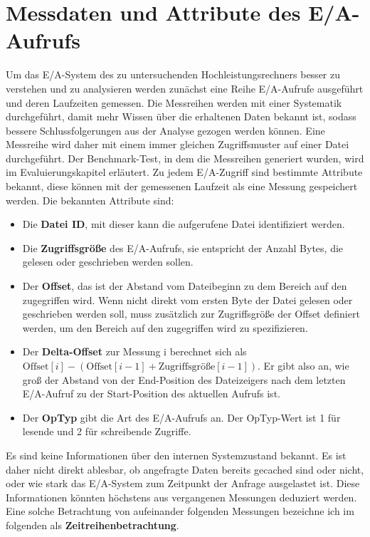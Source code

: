 \documentclass[
	12pt,
	a4paper,
	BCOR10mm,
	DIV14,
	listof=totoc,
	bibliography=totoc,
	headsepline
]{scrreprt}
\begin{document}
\section{Messdaten und Attribute des E/A-Aufrufs}
\label{analyse:mess+att}
Um das E/A-System des zu untersuchenden Hochleistungsrechners besser zu verstehen und zu analysieren werden zunächst eine Reihe E/A-Aufrufe ausgeführt und deren Laufzeiten gemessen. Die Messreihen werden mit einer Systematik durchgeführt, damit mehr Wissen über die erhaltenen Daten bekannt ist, sodass bessere Schlussfolgerungen aus der Analyse gezogen werden können.
Eine Messreihe wird daher mit einem immer gleichen Zugriffsmuster auf einer Datei durchgeführt.
Der Benchmark-Test, in dem die Messreihen generiert wurden, wird im Evaluierungskapitel erläutert.
Zu jedem E/A-Zugriff sind bestimmte Attribute bekannt, diese können mit der gemessenen Laufzeit als eine Messung gespeichert werden.
Die bekannten Attribute sind:
\begin{itemize}
	\item Die \textbf{Datei ID}, mit dieser kann die aufgerufene Datei identifiziert werden.
	\item Die \textbf{Zugriffsgröße} des E/A-Aufrufs, sie entspricht der Anzahl Bytes, die gelesen oder geschrieben werden sollen. 
	\item Der \textbf{Offset}, das ist der Abstand vom Dateibeginn zu dem Bereich auf den zugegriffen wird. Wenn nicht direkt vom ersten Byte der Datei gelesen oder geschrieben werden soll, muss zusätzlich zur Zugriffsgröße der Offset definiert werden, um den Bereich auf den zugegriffen wird zu spezifizieren.
	\item Der \textbf{Delta-Offset} zur Messung i berechnet sich als $\mbox{Offset}[i] - (\mbox{Offset}[i-1] + \mbox{Zugriffsgröße}[i-1])$. Er gibt also an, wie groß der Abstand von der End-Position des Dateizeigers nach dem letzten E/A-Aufruf zu der Start-Position des aktuellen Aufrufs ist.
	\item Der \textbf{OpTyp} gibt die Art des E/A-Aufrufs an. Der OpTyp-Wert ist 1 für lesende und 2 für schreibende Zugriffe.
\end{itemize}
Es sind keine Informationen über den internen Systemzustand bekannt. Es ist daher nicht direkt ablesbar, ob angefragte Daten bereits gecached sind oder nicht, oder wie stark das E/A-System zum Zeitpunkt der Anfrage ausgelastet ist.
Diese Informationen könnten höchstens aus vergangenen Messungen deduziert werden. Eine solche Betrachtung von aufeinander folgenden Messungen bezeichne ich im folgenden als \textbf{Zeitreihenbetrachtung}.
\end{document}
